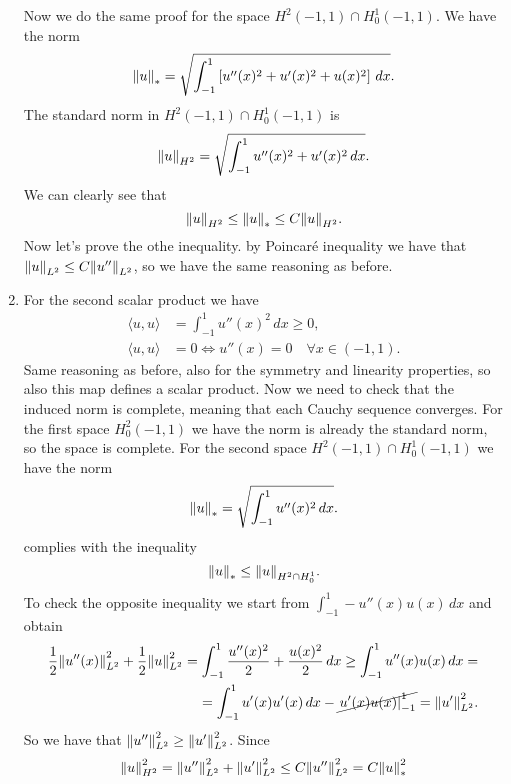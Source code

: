 \begin{enumerate}
          Now we do the same proof for the space \(H^2(-1, 1) \cap H^1_0(-1, 1)\). We
          have the norm
          \[
              \norm{u}_* = \sqrt{\int_{-1}^1 \left[ u''(x)^2 + u'(x)^2 + u(x)^2 \right] \, dx}.
          \]
          The standard norm in \(H^2(-1, 1) \cap H^1_0(-1, 1)\) is
          \[
              \norm{u}_{H^2} = \sqrt{\int_{-1}^1 u''(x)^2 + u'(x)^2 \, dx}.
          \]
          We can clearly see that
          \[
              \norm{u}_{H^2} \leq \norm{u}_* \leq C \norm{u}_{H^2}.
          \]
          Now let's prove the othe inequality. by Poincaré inequality we have that
          \(\norm{u}_{L^2} \leq C \norm{u''}_{L^2}\), so we have the same reasoning as
          before.
    \item For the second scalar product we have
          \[
              \begin{aligned}
                  \langle u, u \rangle & = \int_{-1}^1 u''(x)^2 \, dx \geq 0,             \\
                  \langle u, u \rangle & = 0 \iff u''(x) = 0 \quad \forall x \in (-1, 1).
              \end{aligned}
          \]
          Same reasoning as before, also for the symmetry and linearity properties, so
          also this map defines a scalar product. Now we need to check that the induced
          norm is complete, meaning that each Cauchy sequence converges. For the first
          space \(H^2_0(-1, 1)\) we have the norm is already the standard norm, so the
          space is complete. For the second space \(H^2(-1, 1) \cap H^1_0(-1, 1)\) we
          have the norm
          \[
              \norm{u}_* = \sqrt{\int_{-1}^1 u''(x)^2 \, dx}.
          \]
          complies with the inequality
          \[
              \norm{u}_* \leq \norm{u}_{H^2\cap H^1_0}.
          \]
          To check the opposite inequality we start from \(\int_{-1}^1 -u''(x) u (x) \,
          dx \) and obtain
          \[
              \begin{split}
                  \frac{1}{2} \norm{u''(x)}^2_{L^2} + \frac{1}{2} \norm{u}^2_{L^2} = \int_{-1}^1 \frac{u''(x)^2}{2} + \frac{u(x)^2}{2} \, dx \geq \int_{-1}^1 u''(x) u(x) \, dx = \\= \int_{-1}^1 u'(x) u'(x) \, dx - \cancel{\left. u'(x) u(x) \right|_{-1}^1} = \norm{u'}^2_{L^2}.
              \end{split}
          \]
          So we have that \(\norm{u''}_{L^2}^2 \geq \norm{u'}_{L^2}^2\). Since
          \[
              \norm{u}_{H^2}^2 = \norm{u''}_{L^2}^2 + \norm{u'}_{L^2}^2 \leq C \norm{u''}_{L^2}^2 = C \norm{u}_*^2
          \]


\end{enumerate}
